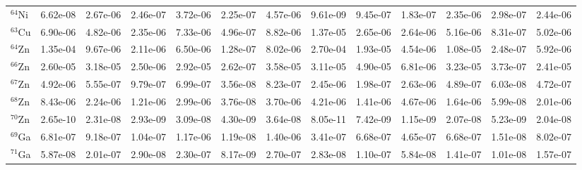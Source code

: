\begin{landscape}
\begin{table}
\begin{tabular}{l|cc|cc|cc|cc|cc|cc}
$^{64}$Ni & 6.62e-08 & 2.67e-06 & 2.46e-07 & 3.72e-06 & 2.25e-07 & 4.57e-06 & 9.61e-09 & 9.45e-07 & 1.83e-07 & 2.35e-06 & 2.98e-07 & 2.44e-06\\
$^{63}$Cu & 6.90e-06 & 4.82e-06 & 2.35e-06 & 7.33e-06 & 4.96e-07 & 8.82e-06 & 1.37e-05 & 2.65e-06 & 2.64e-06 & 5.16e-06 & 8.31e-07 & 5.02e-06\\
$^{64}$Zn & 1.35e-04 & 9.67e-06 & 2.11e-06 & 6.50e-06 & 1.28e-07 & 8.02e-06 & 2.70e-04 & 1.93e-05 & 4.54e-06 & 1.08e-05 & 2.48e-07 & 5.92e-06\\
$^{66}$Zn & 2.60e-05 & 3.18e-05 & 2.50e-06 & 2.92e-05 & 2.62e-07 & 3.58e-05 & 3.11e-05 & 4.90e-05 & 6.81e-06 & 3.23e-05 & 3.73e-07 & 2.41e-05\\
$^{67}$Zn & 4.92e-06 & 5.55e-07 & 9.79e-07 & 6.99e-07 & 3.56e-08 & 8.23e-07 & 2.45e-06 & 1.98e-07 & 2.63e-06 & 4.89e-07 & 6.03e-08 & 4.72e-07\\
$^{68}$Zn & 8.43e-06 & 2.24e-06 & 1.21e-06 & 2.99e-06 & 3.76e-08 & 3.70e-06 & 4.21e-06 & 1.41e-06 & 4.67e-06 & 1.64e-06 & 5.99e-08 & 2.01e-06\\
$^{70}$Zn & 2.65e-10 & 2.31e-08 & 2.93e-09 & 3.09e-08 & 4.30e-09 & 3.64e-08 & 8.05e-11 & 7.42e-09 & 1.15e-09 & 2.07e-08 & 5.23e-09 & 2.04e-08\\
$^{69}$Ga & 6.81e-07 & 9.18e-07 & 1.04e-07 & 1.17e-06 & 1.19e-08 & 1.40e-06 & 3.41e-07 & 6.68e-07 & 4.65e-07 & 6.68e-07 & 1.51e-08 & 8.02e-07\\
$^{71}$Ga & 5.87e-08 & 2.01e-07 & 2.90e-08 & 2.30e-07 & 8.17e-09 & 2.70e-07 & 2.83e-08 & 1.10e-07 & 5.84e-08 & 1.41e-07 & 1.01e-08 & 1.57e-07\\
\hline
\end{tabular}
\end{table}
\end{landscape}




